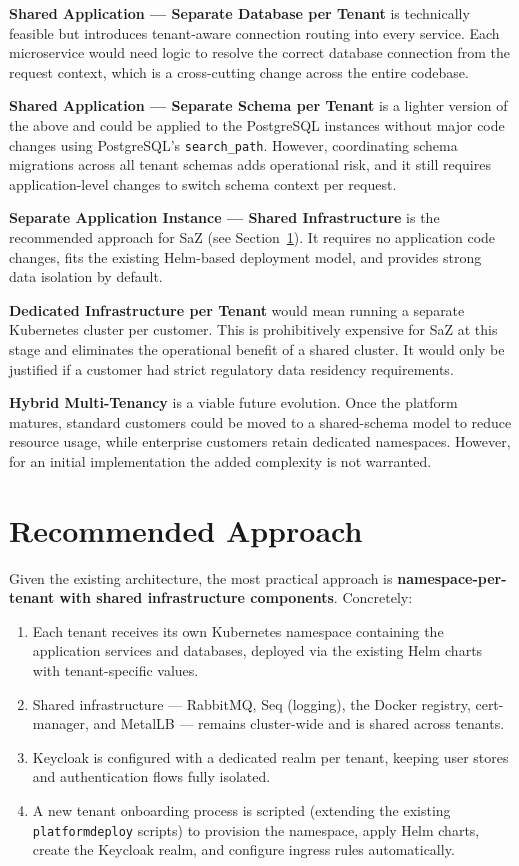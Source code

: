 \textbf{Shared Application --- Separate Database per Tenant} is technically feasible but introduces tenant-aware connection routing into every service. Each microservice would need logic to resolve the correct database connection from the request context, which is a cross-cutting change across the entire codebase.

\textbf{Shared Application --- Separate Schema per Tenant} is a lighter version of the above and could be applied to the PostgreSQL instances without major code changes using PostgreSQL's \texttt{search\_path}. However, coordinating schema migrations across all tenant schemas adds operational risk, and it still requires application-level changes to switch schema context per request.

\textbf{Separate Application Instance --- Shared Infrastructure} is the recommended approach for SaZ (see Section~\ref{sec:recommended}). It requires no application code changes, fits the existing Helm-based deployment model, and provides strong data isolation by default.

\textbf{Dedicated Infrastructure per Tenant} would mean running a separate Kubernetes cluster per customer. This is prohibitively expensive for SaZ at this stage and eliminates the operational benefit of a shared cluster. It would only be justified if a customer had strict regulatory data residency requirements.

\textbf{Hybrid Multi-Tenancy} is a viable future evolution. Once the platform matures, standard customers could be moved to a shared-schema model to reduce resource usage, while enterprise customers retain dedicated namespaces. However, for an initial implementation the added complexity is not warranted.

\section{Recommended Approach}
\label{sec:recommended}

Given the existing architecture, the most practical approach is \textbf{namespace-per-tenant with shared infrastructure components}. Concretely:

\begin{enumerate}
    \item Each tenant receives its own Kubernetes namespace containing the application services and databases, deployed via the existing Helm charts with tenant-specific values.
    \item Shared infrastructure --- RabbitMQ, Seq (logging), the Docker registry, cert-manager, and MetalLB --- remains cluster-wide and is shared across tenants.
    \item Keycloak is configured with a dedicated realm per tenant, keeping user stores and authentication flows fully isolated.
    \item A new tenant onboarding process is scripted (extending the existing \texttt{platformdeploy} scripts) to provision the namespace, apply Helm charts, create the Keycloak realm, and configure ingress rules automatically.
\end{enumerate}

